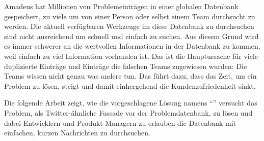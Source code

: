 Amadeus hat Millionen von Problemeinträgen in einer globalen Datenbank gespeichert, zu viele um von einer Person oder selbst einem Team durchsucht zu werden. Die aktuell verfügbaren Werkzeuge im diese Datenbank zu durchsuchen sind nicht ausreichend um schnell und einfach zu suchen. Aus diesem Grund wird es immer schwerer an die wertvollen Informationen in der Datenbank zu kommen, weil einfach zu viel Information vorhanden ist. Das ist die Hauptursache für viele duplizierte Einträge und Einträge die falschen Teams zugewiesen wurden: Die Teams wissen nicht genau was andere tun. Das führt dazu, dass das Zeit, um ein Problem zu lösen, steigt und damit einhergehend die Kundenzufriedenheit sinkt.

Die folgende Arbeit zeigt, wie die vorgeschlagene Lösung namens \enquote{\reporttitle} versucht das Problem, als Twitter-ähnliche Fassade vor der Problemdatenbank, zu lösen und dabei Entwicklern und Produkt-Managern zu erlauben die Datenbank mit einfachen, kurzen Nachrichten zu durchsuchen.